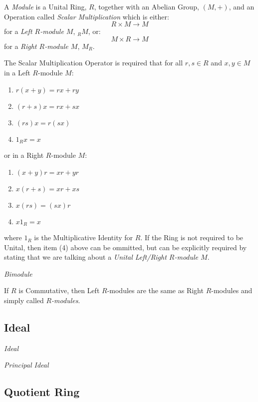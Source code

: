 A \emph{Module} is a Unital Ring, $R$, together with an Abelian Group,
$(M, +)$, and an Operation called \emph{Scalar Multiplication} which
is either:
\[ R \times M \rightarrow M \]
for a \emph{Left $R$-module $M$}, $_R M$, or:
\[ M \times R \rightarrow M \]
for a \emph{Right $R$-module $M$}, $M_R$.

The Scalar Multiplication Operator is required that for all $r,s \in
R$ and $x,y \in M$ in a Left $R$-module $M$:
\begin{enumerate}
    \item $r(x + y) = rx + ry$
    \item $(r + s)x = rx + sx$
    \item $(rs)x = r(sx)$
    \item $1_Rx = x$
\end{enumerate}
or in a Right $R$-module $M$:
\begin{enumerate}
    \item $(x + y)r = xr + yr$
    \item $x(r + s) = xr + xs$
    \item $x(rs) = (sx)r$
    \item $x 1_R = x$
\end{enumerate}
where $1_R$ is the Multiplicative Identity for $R$. If the Ring is not
required to be Unital, then item (4) above can be ommitted, but can be
explicitly required by stating that we are talking about a
\emph{Unital Left/Right $R$-module $M$}.

\emph{Bimodule}

If $R$ is Commutative, then Left $R$-modules are the same as Right
$R$-modules and simply called \emph{$R$-modules}.



\subsection{Ideal}\label{sec:ring_ideal}

\emph{Ideal}

\emph{Principal Ideal}



\subsection{Quotient Ring}



